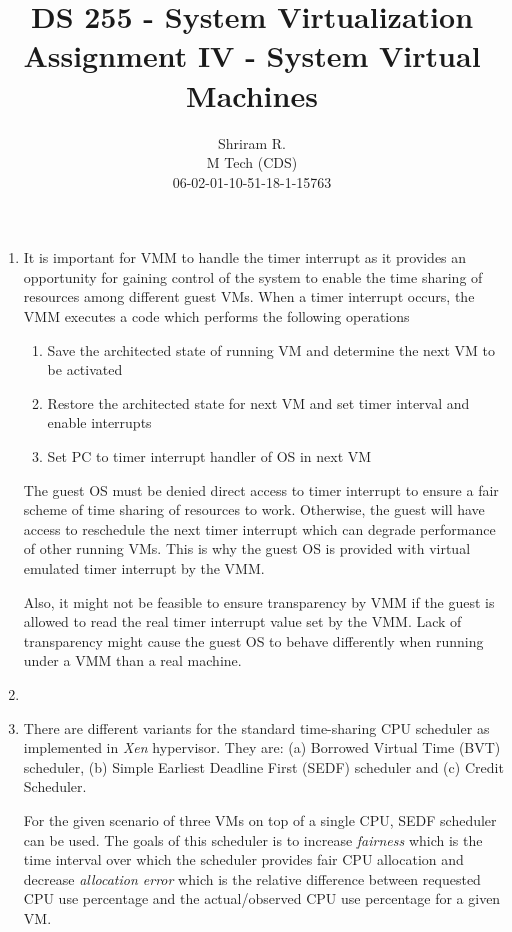 \documentclass[11pt,a4paper,oneside]{article}
\begin{document}
	\title{DS 255 - System Virtualization \\ Assignment IV - System Virtual Machines}
	\author{Shriram R. \\ M Tech (CDS) \\ 06-02-01-10-51-18-1-15763}
	\maketitle	
	
	\begin{enumerate}
		\item It is important for VMM to handle the timer interrupt as it provides an opportunity for gaining control of the system to enable the time sharing of resources among different guest VMs. When a timer interrupt occurs, the VMM executes a code which performs the following operations
		\begin{enumerate}
			\item Save the architected state of running VM and determine the next VM to be activated
			\item Restore the architected state for next VM and set timer interval and enable interrupts
			\item Set PC to timer interrupt handler of OS in next VM
		\end{enumerate}
	    The guest OS must be denied direct access to timer interrupt to ensure a fair scheme of time sharing of resources to work. Otherwise, the guest will have access to reschedule the next timer interrupt which can degrade performance of other running VMs. This is why the guest OS is provided with virtual emulated timer interrupt by the VMM.
	    
	    Also, it might not be feasible to ensure transparency by VMM if the guest is allowed to read the real timer interrupt value set by the VMM. Lack of transparency might cause the guest OS to behave differently when running under a VMM than a real machine.
		\item 
		\item There are different variants for the standard time-sharing CPU scheduler as implemented in \emph{Xen} hypervisor. They are: (a) Borrowed Virtual Time (BVT) scheduler, (b) Simple Earliest Deadline First (SEDF) scheduler and (c) Credit Scheduler. 
		
		For the given scenario of three VMs on top of a single CPU, SEDF scheduler can be used. The goals of this scheduler is to increase \emph{fairness} which is the time interval over which the scheduler provides fair CPU allocation and decrease \emph{allocation error} which is the relative difference between requested CPU use percentage and the actual/observed CPU use percentage for a given VM.
		

\end{enumerate}
\end{document}
